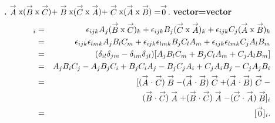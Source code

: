 {\bf {}.}   $ \stackrel{\rightarrow}{A} \textup{x} (\stackrel{\rightarrow}{B}\textup{x} \stackrel{\rightarrow}{C}) +   \stackrel{\rightarrow}{B} \textup{x} (\stackrel{\rightarrow}{C}\textup{x} \stackrel{\rightarrow}{A}) +   \stackrel{\rightarrow}{C} \textup{x} (\stackrel{\rightarrow}{A}\textup{x} \stackrel{\rightarrow}{B})= \stackrel{\rightarrow}{0}$.
{\flushleft \bf vector=vector}
\begin{eqnarray*}
[\stackrel{\rightarrow}{A} \textup{x} (\stackrel{\rightarrow}{B}\textup{x} \stackrel{\rightarrow}{C}) +   \stackrel{\rightarrow}{B} \textup{x} (\stackrel{\rightarrow}{C}\textup{x} \stackrel{\rightarrow}{A}) +   \stackrel{\rightarrow}{C} \textup{x} (\stackrel{\rightarrow}{A}\textup{x} \stackrel{\rightarrow}{B})]_i & = &
\epsilon_{ijk} A_j (\stackrel{\rightarrow}{B}\textup{x} \stackrel{\rightarrow}{C})_k +
\epsilon_{ijk} B_j (\stackrel{\rightarrow}{C}\textup{x} \stackrel{\rightarrow}{A})_k +
\epsilon_{ijk} C_j (\stackrel{\rightarrow}{A}\textup{x} \stackrel{\rightarrow}{B})_k \\
&=&\epsilon_{ijk}\epsilon_{lmk}A_jB_lC_m + \epsilon_{ijk}\epsilon_{lmk}B_jC_lA_m + \epsilon_{ijk}\epsilon_{lmk}C_jA_lB_m\\
&=& (\delta_{il}\delta_{jm}-\delta_{im}\delta_{jl})[A_jB_lC_m+B_jC_lA_m+C_jA_lB_m]\\
&=&A_jB_iC_j - A_jB_jC_i+B_jC_iA_j-B_jC_jA_i+C_jA_iB_j-C_jA_jB_i\\
&=&[(\stackrel{\rightarrow}{A} \cdot \stackrel{\rightarrow}{C})\stackrel{\rightarrow}{B}-
(\stackrel{\rightarrow}{A} \cdot \stackrel{\rightarrow}{B})\stackrel{\rightarrow}{C}+
(\stackrel{\rightarrow}{A} \cdot \stackrel{\rightarrow}{B})\stackrel{\rightarrow}{C}-\\
&&
(\stackrel{\rightarrow}{B} \cdot \stackrel{\rightarrow}{C})\stackrel{\rightarrow}{A}+
(\stackrel{\rightarrow}{B} \cdot \stackrel{\rightarrow}{C})\stackrel{\rightarrow}{A}-
(\stackrel{\rightarrow}{C} \cdot \stackrel{\rightarrow}{A})\stackrel{\rightarrow}{B}]_i\\
&=&[\stackrel{\rightarrow}{0}]_i.
\end{eqnarray*}